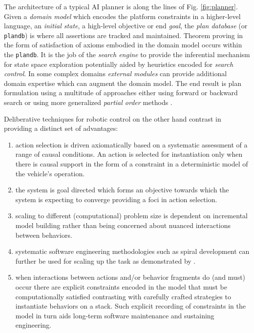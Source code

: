 The architecture of a typical AI planner is along the lines of
Fig. \ref{fig:planner}. Given a \emph{domain model} which encodes the
platform constraints in a higher-level language, an \emph{initial
  state}, a high-level objective or end \emph{goal}, the \emph{plan
  database} (or \texttt{plandb}) is where all assertions are tracked
and maintained. Theorem proving in the form of satisfaction of axioms
embodied in the domain model occurs within the \texttt{plandb}. It is
the job of the \emph{search engine} to provide the inferential
mechanism for state space exploration potentially aided by heuristics
encoded for \emph{search control}. In some complex domains
\cite{mus98} \emph{external modules} can provide additional domain
expertise which can augment the domain model. The end result is plan
formulation using a multitude of approaches either using forward or
backward search or using more generalized \emph{partial order} methods
\cite{ghallab04}.

Deliberative techniques for robotic control on the other hand
contrast in providing a distinct set of advantages:

\begin{enumerate}

\item action selection is driven axiomatically based on a systematic
  assessment of a range of causal conditions. An action is selected
  for instantiation only when there is causal support in the form of a
  constraint in a deterministic model of the vehicle's operation.

\item the system is goal directed which forms an objective towards
  which the system is expecting to converge providing a foci in action
  selection.

\item scaling to different (computational) problem size is dependent
  on incremental model building rather than being concerned about
  nuanced interactions between behaviors.

\item systematic software engineering methodologies such as spiral
  development \cite{boehm86} can further be used for scaling up the
  task as demonstrated by \cite{DS1report}.

\item when interactions between actions and/or behavior fragments do
  (and must) occur there are explicit constraints encoded in the model
  that must be computationally satisfied contrasting with carefully
  crafted strategies to instantiate behaviors on a stack. Such
  explicit recording of constraints in the model in turn aids
  long-term software maintenance and sustaining engineering.

\end{enumerate}

